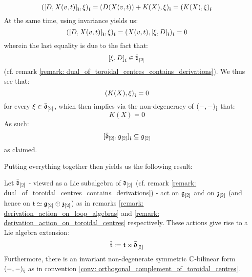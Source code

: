 \begin{remark}
                    $$( [ D, X(v, t) ]_{\hat{\mathfrak{t}}}, \xi )_{\hat{\mathfrak{t}}} = (D( X(v, t) ) + K(X), \xi)_{\hat{\mathfrak{t}}} = (K(X), \xi)_{\hat{\mathfrak{t}}}$$
                At the same time, using invariance yields us:
                    $$( [ D, X(v, t) ]_{\hat{\mathfrak{t}}}, \xi )_{\hat{\mathfrak{t}}} = (X(v, t), [\xi, D]_{\hat{\mathfrak{t}}})_{\hat{\mathfrak{t}}} = 0$$
                wherein the last equality is due to the fact that:
                    $$[\xi, D]_{\hat{\mathfrak{t}}} \in \bar{\mathfrak{d}}_{[2]}$$
                (cf. remark \ref{remark: dual_of_toroidal_centres_contains_derivations}). We thus see that:
                    $$(K(X), \xi)_{\hat{\mathfrak{t}}} = 0$$
                for every $\xi \in \bar{\mathfrak{d}}_{[2]}$, which then implies via the non-degeneracy of $(-, -)_{\hat{\mathfrak{t}}}$ that:
                    $$K(X) = 0$$
                As such:
                    $$[ \bar{\mathfrak{d}}_{[2]}, \mathfrak{g}_{[2]} ]_{\hat{\mathfrak{t}}} \subseteq \mathfrak{g}_{[2]}$$
                as claimed. 
            \end{remark}

            Putting everything together then yields us the following result:
            \begin{proposition} \label{prop: extended_toroidal_lie_algebras}
                Let $\bar{\mathfrak{d}}_{[2]}$ - viewed as a Lie subalgebra of $\mathfrak{d}_{[2]}$ (cf. remark \ref{remark: dual_of_toroidal_centres_contains_derivations}) - act on $\mathfrak{g}_{[2]}$ and on $\mathfrak{z}_{[2]}$ (and hence on $\mathfrak{t} \simeq \mathfrak{g}_{[2]} \oplus \mathfrak{z}_{[2]}$) as in remarks \ref{remark: derivation_action_on_loop_algebras} and \ref{remark: derivation_action_on_toroidal_centres} respectively. These actions give rise to a Lie algebra extension:
                    $$\hat{\mathfrak{t}} := \mathfrak{t} \rtimes \bar{\mathfrak{d}}_{[2]}$$
                Furthermore, there is an invariant non-degenerate symmetric $\mathbb{C}$-bilinear form $(-, -)_{\hat{\mathfrak{t}}}$ as in convention \ref{conv: orthogonal_complement_of_toroidal_centres}. 
            \end{proposition}

